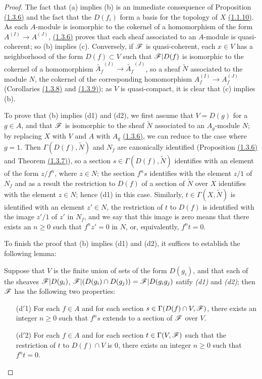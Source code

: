 \begin{proof}
\label{proof-thm-1.1.4.1}
The fact that (a) implies (b) is an immediate consequence of Proposition \hyperref[prop-1.1.3.6]{(1.3.6)} and the fact
that the $D(f_i)$ form a basis for the topology of $X$ \hyperref[prop-1.1.1.10]{(1.1.10)}. As each
$A$-module is isomorphic to the cokernel of a homomorphism of the form $A^{(I)}\to A^{(J)}$,
\hyperref[prop-1.1.3.6]{(1.3.6)} proves that each sheaf associated to an $A$-module is quasi-coherent; so
(b) implies (c). Conversely, if $\mathscr{F}$ is quasi-coherent, each $x\in V$ has a neighborhood
of the form $D(f)\subset V$ such that $\mathscr{F}|D(f)$ is isomorphic to the cokernel of a
homomorphism $\widetilde{A_f}^{(I)}\to\widetilde{A_f}^{(J)}$, so a sheaf $\widetilde{N}$
associated to the module $N$, the cokernel of the corresponding homomorphism
$A_f^{(I)}\to A_f^{(J)}$ (Corollaries \hyperref[cor-1.1.3.8]{(1.3.8)} and \hyperref[cor-1.1.3.9]{(1.3.9)}); as $V$ is quasi-compact,
it is clear that (c) implies (b).

To prove that (b) implies (d1) and (d2), we first assume that $V=D(g)$ for a $g\in A$, and
that $\mathscr{F}$ is isomorphic to the sheaf $\widetilde{N}$ associated to an $A_g$-module $N$;
by replacing $X$ with $V$ and $A$ with $A_g$ \hyperref[prop-1.1.3.6]{(1.3.6)}, we can reduce to the case
where $g=1$. Then $\Gamma(D(f),\widetilde{N})$ and $N_f$ are canonically identified
(Proposition \hyperref[prop-1.1.3.6]{(1.3.6)} and Theorem \hyperref[thm-1.1.3.7]{(1.3.7)}), so a section $s\in\Gamma(D(f),\widetilde{N})$
identifies with an element of the form $z/f^n$, where $z\in N$; the section $f^n s$ identifies
with the element $z/1$ of $N_f$ and as a result the restriction to $D(f)$ of a section of
$\widetilde{N}$ over $X$ identifies with the element $z\in N$; hence (d1) in this case.
Similarly, $t\in\Gamma(X,\widetilde{N})$ is identified with an element $z'\in N$, the
restriction of $t$ to $D(f)$ is identified with the image $z'/1$ of $z'$ in $N_f$, and we say
that this image is zero means that there exists an $n\geqslant 0$ such that $f^n z'=0$ in
$N$, or, equivalently, $f^n t=0$.

To finish the proof that (b) implies (d1) and (d2), it suffices to establish the following
lemma:
\begin{lem}[1.4.1.1]
\label{lem-1.1.4.1.1}
Suppose that $V$ is the finite union of sets of the form $D(g_i)$, and that each of the
sheaves $\mathscr{F}|D(g_i)$, $\mathscr{F}|(D(g_i)\cap D(g_j))=\mathscr{F}|D(g_i g_j)$ satify {\it (d1)}
and {\it (d2)}; then $\mathscr{F}$ has the following two properties:
\begin{itemize}
  \item[{\rm(d$'$1)}] For each $f\in A$ and for each section $s\in\Gamma(D(f)\cap V,\mathscr{F})$, there exists
        an integer $n\geqslant 0$ such that $f^n s$ extends to a section of $\mathscr{F}$ over
        $V$.
  \item[{\rm(d$'$2)}] For each $f\in A$ and for each section $t\in\Gamma(V,\mathscr{F})$ such that the
        restriction of $t$ to $D(f)\cap V$ is $0$, there exists an integer $n\geqslant 0$
        such that $f^n t=0$.
\end{itemize}
\end{lem}


\end{proof}
